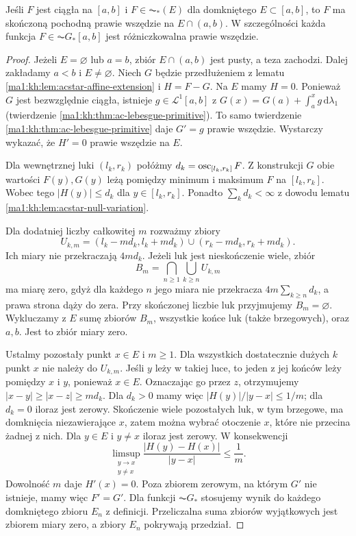 \begin{twierdzenie}
\label{ma1:kh:thm:acstar-ae-differentiable}\label{it:thm:acstar-ae-differentiable}
Jeśli $F$ jest ciągła na $[a,b]$ i $F\in\AC_*(E)$ dla domkniętego $E\subset[a,b]$, to $F$ ma skończoną pochodną prawie wszędzie na $E\cap(a,b)$. W szczególności każda funkcja $F\in\AC G_*[a,b]$ jest różniczkowalna prawie wszędzie.
\end{twierdzenie}
\begin{proof}
Jeżeli $E=\varnothing$ lub $a=b$, zbiór $E\cap(a,b)$
jest pusty, a teza zachodzi. Dalej zakładamy $a<b$
i $E\ne\varnothing$. Niech $G$ będzie przedłużeniem
z lematu \ref{ma1:kh:lem:acstar-affine-extension} i $H=F-G$. Na $E$ mamy $H=0$. Ponieważ $G$ jest bezwzględnie ciągła, istnieje $g\in\mathcal L^1[a,b]$ z $G(x)=G(a)+\int_a^x g\,\mathrm d\lambda_1$ (twierdzenie \ref{ma1:kh:thm:ac-lebesgue-primitive}). To samo twierdzenie \ref{ma1:kh:thm:ac-lebesgue-primitive} daje $G'=g$ prawie wszędzie. Wystarczy wykazać, że $H'=0$ prawie wszędzie na $E$.

Dla wewnętrznej luki $(l_k,r_k)$ połóżmy $d_k=\operatorname{osc}_{[l_k,r_k]}F$. Z konstrukcji $G$ obie wartości $F(y),G(y)$ leżą pomiędzy minimum i maksimum $F$ na $[l_k,r_k]$. Wobec tego $|H(y)|\le d_k$ dla $y\in[l_k,r_k]$. Ponadto $\sum_k d_k<\infty$ z dowodu lematu \ref{ma1:kh:lem:acstar-null-variation}.

Dla dodatniej liczby całkowitej $m$ rozważmy zbiory
\[
 U_{k,m}=(l_k-md_k,l_k+md_k)\cup(r_k-md_k,r_k+md_k).
\]
Ich miary nie przekraczają $4md_k$. Jeżeli luk jest nieskończenie wiele, zbiór
\[
 B_m=\bigcap_{n\ge1}\bigcup_{k\ge n}U_{k,m}
\]
ma miarę zero, gdyż dla każdego $n$ jego miara nie przekracza $4m\sum_{k\ge n}d_k$, a prawa strona dąży do zera. Przy skończonej liczbie luk przyjmujemy $B_m=\varnothing$. Wykluczamy z $E$ sumę zbiorów $B_m$, wszystkie końce luk (także brzegowych), oraz $a,b$. Jest to zbiór miary zero.

Ustalmy pozostały punkt $x\in E$ i $m\ge1$. Dla wszystkich dostatecznie dużych $k$ punkt $x$ nie należy do $U_{k,m}$. Jeśli $y$ leży w takiej luce, to jeden z jej końców leży pomiędzy $x$ i $y$, ponieważ $x\in E$. Oznaczając go przez $z$, otrzymujemy $|x-y|\ge |x-z|\ge md_k$. Dla $d_k>0$ mamy więc $|H(y)|/|y-x|\le1/m$; dla $d_k=0$ iloraz jest zerowy. Skończenie wiele pozostałych luk, w tym brzegowe, ma domknięcia niezawierające $x$, zatem można wybrać otoczenie $x$, które nie przecina żadnej z nich. Dla $y\in E$ i $y\ne x$ iloraz jest zerowy. W konsekwencji
\[
 \limsup_{\substack{y\to x\\y\ne x}}
 \frac{|H(y)-H(x)|}{|y-x|}\le\frac1m.
\]
Dowolność $m$ daje $H'(x)=0$. Poza zbiorem zerowym, na którym $G'$ nie istnieje, mamy więc $F'=G'$. Dla funkcji $\AC G_*$ stosujemy wynik do każdego domkniętego zbioru $E_n$ z definicji. Przeliczalna suma zbiorów wyjątkowych jest zbiorem miary zero, a zbiory $E_n$ pokrywają przedział.
\end{proof}

